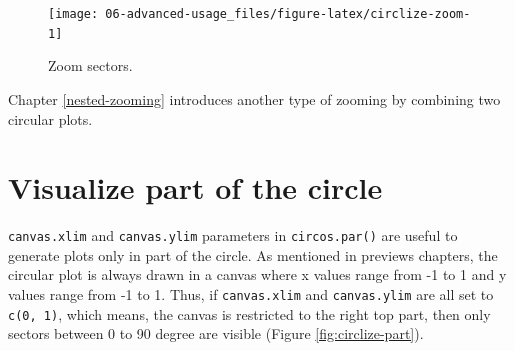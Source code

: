 \documentclass[]{book}
\newenvironment{Shaded}{\begin{snugshade}}{\end{snugshade}}
\newcommand{\KeywordTok}[1]{\textcolor[rgb]{0.13,0.29,0.53}{\textbf{#1}}}
\newcommand{\DataTypeTok}[1]{\textcolor[rgb]{0.13,0.29,0.53}{#1}}
\newcommand{\DecValTok}[1]{\textcolor[rgb]{0.00,0.00,0.81}{#1}}
\newcommand{\StringTok}[1]{\textcolor[rgb]{0.31,0.60,0.02}{#1}}
\newcommand{\OtherTok}[1]{\textcolor[rgb]{0.56,0.35,0.01}{#1}}
\newcommand{\NormalTok}[1]{#1}
\begin{document}
\begin{Shaded}
\end{Shaded}

\begin{figure}

{\centering \texttt{[image: 06-advanced-usage\_files/figure-latex/circlize-zoom-1]} 

}

\caption{Zoom sectors.}\label{fig:circlize-zoom}
\end{figure}

Chapter \ref{nested-zooming} introduces another type of zooming by
combining two circular plots.

\section{Visualize part of the circle}\label{part-circle}

\texttt{canvas.xlim} and \texttt{canvas.ylim} parameters in
\texttt{circos.par()} are useful to generate plots only in part of the
circle. As mentioned in previews chapters, the circular plot is always
drawn in a canvas where x values range from -1 to 1 and y values range
from -1 to 1. Thus, if \texttt{canvas.xlim} and \texttt{canvas.ylim} are
all set to \texttt{c(0,\ 1)}, which means, the canvas is restricted to
the right top part, then only sectors between 0 to 90 degree are visible
(Figure \ref{fig:circlize-part}).
\end{document}

